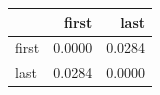\begin{tabular}{lrr}
\toprule
 & first & last \\
\midrule
first & 0.0000 & 0.0284 \\
last & 0.0284 & 0.0000 \\
\bottomrule
\end{tabular}
